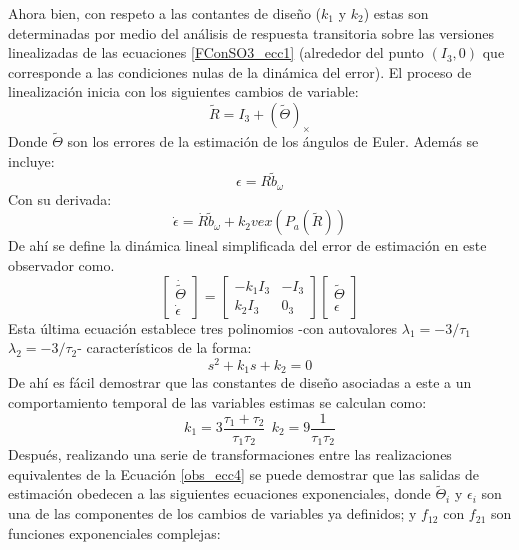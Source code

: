 \documentclass[10pt]{report}
\numberwithin{equation}{chapter}
\numberwithin{algorithm}{chapter}
\newcommand{\lucia}{vex(P_a(\tilde{R}))}
\begin{document}
Ahora bien, con respeto a las contantes de diseño ($k_1$ y $k_2$) estas son determinadas por medio del análisis de respuesta transitoria sobre las versiones linealizadas de las ecuaciones \eqref{FConSO3_ecc1} (alrededor del punto $(I_3,0)$ que corresponde a las condiciones nulas de la dinámica del error). El proceso de linealización inicia con los siguientes cambios de variable: 
\begin{equation*}
\tilde{R}=I_3+(\tilde{\Theta})_\times
\end{equation*}
Donde $\tilde{\Theta}$ son los errores de la estimación de los ángulos de Euler. Además se incluye:
\begin{equation*}
\epsilon=R\tilde{b}_\omega
\end{equation*}
Con su derivada:
\begin{equation*}
\dot{\epsilon}=\dot{R}\tilde{b}_\omega+k_2 \lucia
\end{equation*}
De ahí se define la dinámica lineal simplificada del error de estimación en este observador como.
\begin{equation}\label{obs_ecc4}
\begin{bmatrix}\dot{\tilde{\Theta}}\\\dot{\epsilon}\end{bmatrix}=
\begin{bmatrix}-k_1I_3&-I_3\\k_2I_3&0_3\end{bmatrix}
\begin{bmatrix}\tilde{\Theta}\\\epsilon\end{bmatrix}
\end{equation}
Esta última ecuación establece tres polinomios -con autovalores $\lambda_1=-3/\tau_1$ $\lambda_2=-3/\tau_2$- característicos de la forma:
\begin{equation}
s^2+k_1s+k_2=0
\end{equation}
De ahí es fácil demostrar que las constantes de diseño asociadas a este a un comportamiento temporal de las variables estimas se calculan como:
\begin{equation}\label{obs_ecc10}
k_1=3\frac{\tau_1+\tau_2}{\tau_1\tau_2}~~k_2=9\frac{1}{\tau_1\tau_2}
\end{equation}
Después, realizando una serie de transformaciones entre las realizaciones equivalentes de la Ecuación \eqref{obs_ecc4} se puede demostrar que las salidas de estimación obedecen a las siguientes ecuaciones exponenciales, donde $\tilde{\Theta}_i$ y $\epsilon_i$ son una de las componentes de los cambios de variables ya definidos; y $f_{12}$ con $f_{21}$ son funciones exponenciales complejas:
\end{document}

